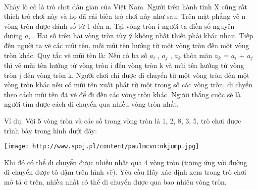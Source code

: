  

Nhảy lò cò là trò chơi dân gian của Việt Nam. Người trên hành tinh X cũng rất thích trò chơi này và họ đã cải biên trò chơi này như sau: Trên mặt phẳng vẽ n vòng tròn được đánh số từ 1 đến n. Tại vòng tròn i người ta điền số nguyên dương $a_{i}$ . Hai số trên hai vòng tròn tùy ý không nhất thiết phải khác nhau. Tiếp đến người ta vẽ các mũi tên, mỗi mũi tên hướng từ một vòng tròn đến một vòng tròn khác. Quy tắc vẽ mũi tên là: Nếu có ba số $a_{i}$ , $a_{j}$ , $a_{k}$ thỏa mãn $a_{k}$ = $a_{i}$ + $a_{j}$ thì vẽ mũi tên hướng từ vòng tròn i đến vòng tròn k và mũi tên hướng từ vòng tròn j đến vòng tròn k. Người chơi chỉ được di chuyển từ một vòng tròn đến một vòng tròn khác nếu có mũi tên xuất phát từ một trong số các vòng tròn, di chyển theo cách mũi tên đã vẽ để đi đến các vòng tròn khác. Người thắng cuộc sẽ là người tìm được cách di chuyển qua nhiều vòng tròn nhất.

Ví dụ: Với 5 vòng tròn và các số trong vòng tròn là 1, 2, 8, 3, 5, trò chơi được trình bày trong hình dưới đây:


\texttt{[image: http://www.spoj.pl/content/paulmcvn:nkjump.jpg]}

Khi đó có thể di chuyển được nhiều nhất qua 4 vòng tròn (tương ứng với đường di chuyển được tô đậm trên hình vẽ).
Yêu cầu
Hãy xác định xem trong trò chơi mô tả ở trên, nhiều nhất có thể di chuyển được qua bao nhiêu vòng tròn.